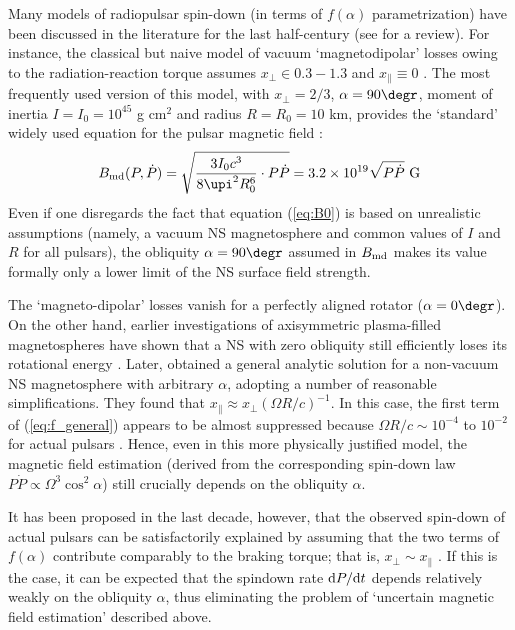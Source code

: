 \documentclass[fleqn,usenatbib]{mnras}
\begin{document}
Many models of radiopulsar spin-down (in terms of $f(\alpha)$
parametrization) have been discussed in the literature for the last
half-century (see \cite{bes13} for a review).
For instance, the classical but naive model of vacuum `magnetodipolar' losses owing to the radiation-reaction torque assumes
$x_{\perp} \in 0.3-1.3$ and $x_{\parallel} \equiv 0$ \citep{deu55, dg70, good85, melatos2000}. The most frequently used version of this model, with $x_{\perp} = 2/3$, $\alpha = 90\degr$, moment of inertia
$I = I_0 = 10^{45}$ g cm$^2$ and radius $R = R_0 = 10$ km, provides the
`standard' widely used equation for the pulsar magnetic field \citep[e.g.][]{mt77, st83}:
\begin{equation}
    B_{\rm md}(P, \dot P) = \sqrt{\dfrac{3 I_0 c^3}{8\upi^2 R_0^6} \cdot P \dot P} = 3.2\times 10^{19} \sqrt{P \dot P}\mbox{ G}
    \label{eq:B0}
\end{equation}
Even if one disregards the fact that equation (\ref{eq:B0}) is based on unrealistic assumptions (namely, a vacuum NS magnetosphere and
common values of $I$ and $R$ for all pulsars), the obliquity $\alpha =
90\degr$ assumed in $B_{\rm md}$  makes its value formally only a lower limit of the
NS surface field strength.

The `magneto-dipolar' losses vanish for a perfectly aligned rotator ($\alpha
= 0\degr$). On the other hand, earlier investigations of axisymmetric plasma-filled magnetospheres have shown that a NS
with zero obliquity still efficiently loses its rotational energy \citep[e.g][]{gj69, michel73, rs75}. Later, \cite{bes93} obtained
a general analytic solution for a non-vacuum NS magnetosphere with arbitrary $\alpha$, adopting a number of reasonable simplifications.
They found that $x_{\parallel} \approx
x_{\perp} (\Omega R/c)^{-1}$. In this case, the first term of (\ref{eq:f_general})
appears to be almost suppressed because $\Omega R/c \sim 10^{-4}$ to $10^{-2}$ for
actual pulsars \citep
[see also][]{bes07}. Hence, even in
this more physically justified model, the magnetic field estimation
(derived from the corresponding spin-down law $P\dot P \propto \Omega^3 \cos^2\alpha$)
still crucially depends on the obliquity $\alpha$.

It has been proposed in the last decade, however, that the observed spin-down of actual pulsars can be satisfactorily explained
by assuming that the two terms of $f(\alpha)$ contribute comparably to the
braking torque; that is, $x_{\perp} \sim x_{\parallel}$ \citep{xu01, cs06, bars09, bars10, kou15, kou16, ou16}. If this is the case, it can be expected that the 
spindown rate ${\rm d}P/{\rm d}t$ depends relatively weakly on the obliquity $\alpha$, thus
eliminating the problem of `uncertain magnetic field estimation'
described above.
\end{document}
